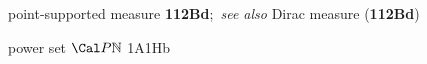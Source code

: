 














point-supported measure {\bf 112Bd};\ 
  {\it see also} Dirac measure ({\bf 112Bd})








































































{power set $\Cal P\Bbb N$ }
1A1Hb
























